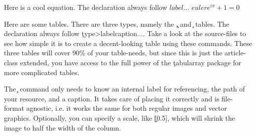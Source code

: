 \documentclass[article,twocolumn]{lix}
\begin{document}
Here is a cool equation. The declaration always follow \c{\begin{math}{label} ... \end{math}}
\begin{math}{euler}
    e^{i\pi}+1=0
\end{math}

Here are some tables. There are three types, namely the \c{\cols, \rows} and \c{\grid} tables. The declaration always follow \c{\<type>{label}{caption}{...}}. Take a look at the source-files to see how simple it is to create a decent-looking table using these commands. These three tables will cover 90\% of your table-needs, but since this is just the article-class extended, you have access to the full power of the \c{tabularray}\cite{tabularray} package for more complicated tables.




The \c{} command only needs to know an internal label for referencing, the path of your resource, and a caption. It takes care of placing it correctly and is file-format agnostic, i.e. it works the same for both regular images and vector graphics. Optionally, you can specify a scale, like \c{[0.5]}, which will shrink the image to half the width of the column.

\end{document}
